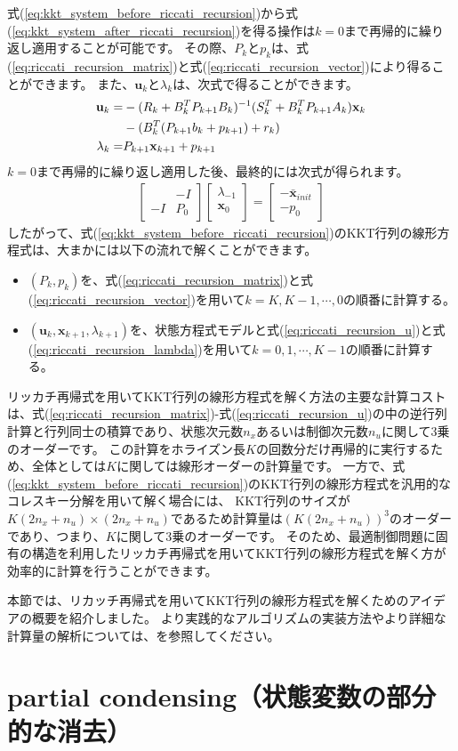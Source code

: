\documentclass[a4paper]{jarticle}
\begin{document}
式(\ref{eq:kkt_system_before_riccati_recursion})から式(\ref{eq:kkt_system_after_riccati_recursion})を得る操作は$k=0$まで再帰的に繰り返し適用することが可能です。
その際、$P_k$と$p_k$は、式(\ref{eq:riccati_recursion_matrix})と式(\ref{eq:riccati_recursion_vector})により得ることができます。
また、$\mathbf{u}_{k}$と$\lambda_{k}$は、次式で得ることができます。
\begin{align}
\mathbf{u}_{k}
=&
-(R_{k} + B_{k}^TP_{k+1}B_{k} )^{-1}(S_{k}^T + B_k^TP_{k+1}A_{k})\mathbf{x}_{k}
\notag
\\
&
-(B^T_{k}(P_{k+1}b_{k}+p_{k+1}) + r_{k})
\label{eq:riccati_recursion_u}
\\
\lambda_{k}
=&
P_{k+1}\mathbf{x}_{k+1} + p_{k+1}
\label{eq:riccati_recursion_lambda}
\end{align}
$k=0$まで再帰的に繰り返し適用した後、最終的には次式が得られます。
\begin{align*}
\begin{bmatrix}
&  -I\\
-I &  P_{0}
\end{bmatrix}
\begin{bmatrix}
\lambda_{-1}\\
\mathbf{x}_{0}\\
\end{bmatrix}
=
\begin{bmatrix}
-\bar{\mathbf{x}}_{init}\\
-p_{0}
\end{bmatrix}
\end{align*}
したがって、式(\ref{eq:kkt_system_before_riccati_recursion})のKKT行列の線形方程式は、大まかには以下の流れで解くことができます。
\begin{itemize}
\item $(P_k,p_k)$を、式(\ref{eq:riccati_recursion_matrix})と式(\ref{eq:riccati_recursion_vector})を用いて$k=K,K-1,\cdots,0$の順番に計算する。
\item $(\mathbf{u}_{k},\mathbf{x}_{k+1},\lambda_{k+1})$を、状態方程式モデルと式(\ref{eq:riccati_recursion_u})と式(\ref{eq:riccati_recursion_lambda})を用いて$k=0,1,\cdots,K-1$の順番に計算する。
\end{itemize}

リッカチ再帰式を用いてKKT行列の線形方程式を解く方法の主要な計算コストは、式(\ref{eq:riccati_recursion_matrix})-式(\ref{eq:riccati_recursion_u})の中の逆行列計算と行列同士の積算であり、状態次元数$n_x$あるいは制御次元数$n_u$に関して3乗のオーダーです。
この計算をホライズン長$K$の回数分だけ再帰的に実行するため、全体としては$K$に関しては線形オーダーの計算量です。
一方で、式(\ref{eq:kkt_system_before_riccati_recursion})のKKT行列の線形方程式を汎用的なコレスキー分解を用いて解く場合には、
KKT行列のサイズが$K(2n_x+n_u)\times(2n_x+n_u)$であるため計算量は$(K(2n_x+n_u))^3$のオーダーであり、つまり、$K$に関して3乗のオーダーです。
そのため、最適制御問題に固有の構造を利用したリッカチ再帰式を用いてKKT行列の線形方程式を解く方が効率的に計算を行うことができます。

本節では、リカッチ再帰式を用いてKKT行列の線形方程式を解くためのアイデアの概要を紹介しました。
より実践的なアルゴリズムの実装方法やより詳細な計算量の解析については、\cite{frison2015algorithms}を参照してください。


\clearpage
\section{partial condensing（状態変数の部分的な消去）}



\end{document}
